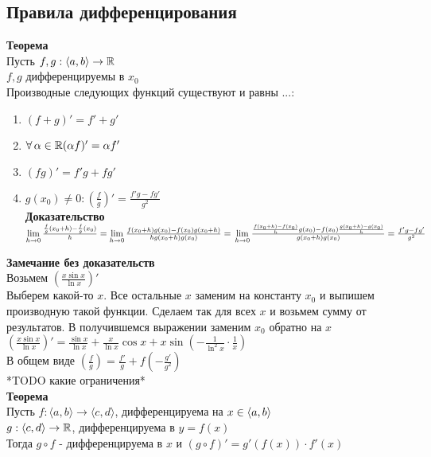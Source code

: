 \documentclass[12pt]{article}
\begin{document}
\subsection{Правила дифференцирования}
\textbf{Теорема}\\
Пусть  $f,g: \langle a, b \rangle \rightarrow \mathbb{R}$\\
$f,g$ дифференцируемы в $x_0$\\
Производные следующих функций существуют и равны ...:
\begin{enumerate}
    \item $(f+g)' = f' + g'$
    \item $\forall\,\alpha \in \mathbb{R} (\alpha f)' = \alpha f'$
    \item $(fg)' = f'g+fg'$
    \item $g(x_0) \neq 0: \left(\frac fg \right)' = \frac{f'g-fg'}{g^2}$\\
    \textbf{Доказательство}\\
    $\lim\limits_{h\rightarrow 0} \frac{\frac fg (x_0+h) - \frac fg (x_0)}h = \lim\limits_{h \rightarrow 0} \frac{f(x_0+h)g(x_0)-f(x_0)g(x_0+h)}{hg(x_0+h)g(x_0)} = \\\lim\limits_{h \rightarrow 0} \frac{\frac{f(x_0+h)-f(x_0)}hg(x_0) - f(x_0)\frac{g(x_0+h)-g(x_0)}{h}}{g(x_0+h)g(x_0)} = \frac{f'g-fg'}{g^2}$
\end{enumerate}
\textbf{Замечание без доказательств}\\
Возьмем $\left( \frac{x\sin x}{\ln x}\right)'$\\
Выберем какой-то $x$. Все остальные $x$ заменим на константу $x_0$ и выпишем производную такой функции. Сделаем так для всех $x$ и возьмем сумму от результатов. В получившемся выражении заменим $x_0$ обратно на $x$\\
$\left( \frac{x\sin x}{\ln x}\right)' = \frac{\sin x}{\ln x} + \frac{x}{\ln x}\cos x + x\sin\left(-\frac{1}{\ln^2 x} \cdot \frac 1x\right)$\\
В общем виде $\left(\frac{f}{g}\right) = \frac{f'}{g} + f\left(-\frac{g'}{g^2}\right)$\\
*TODO какие ограничения*\\
\textbf{Теорема}\\
Пусть $f: \langle a, b \rangle \rightarrow \langle c, d \rangle$, дифференцируема на $x \in \langle a, b \rangle$\\
$g: \langle c, d \rangle \rightarrow \mathbb{R}$, дифференцируема в $y = f(x)$\\
Тогда $g\circ f$ - дифференцируема в $x$ и $(g \circ f)' = g'(f(x))\cdot f'(x)$\\
\end{document}
